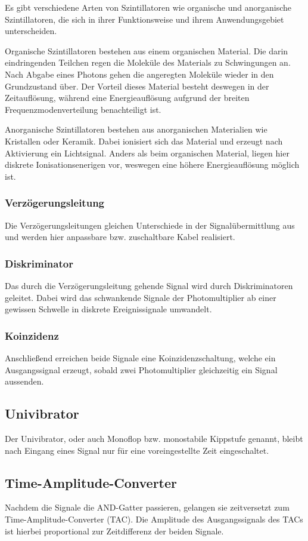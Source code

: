 Es gibt verschiedene Arten von Szintillatoren wie organische und anorganische Szintillatoren,
die sich in ihrer Funktionsweise und ihrem Anwendungsgebiet unterscheiden.

Organische Szintillatoren bestehen aus einem organischen Material.
Die darin eindringenden Teilchen regen die Moleküle des Materials zu Schwingungen an. 
Nach Abgabe eines Photons gehen die angeregten Moleküle wieder in den Grundzustand über.
Der Vorteil dieses Material besteht deswegen in der Zeitauflösung, 
während eine Energieauflösung aufgrund der breiten Frequenzmodenverteilung benachteiligt ist.

Anorganische Szintillatoren bestehen aus anorganischen Materialien wie Kristallen oder Keramik. 
Dabei ionisiert sich das Material und erzeugt nach Aktivierung ein Lichtsignal.
Anders als beim organischen Material, liegen hier diskrete Ionisationsenerigen vor,
weswegen eine höhere Energieauflösung möglich ist.

\subsubsection*{Verzögerungsleitung}
Die Verzögerungsleitungen gleichen Unterschiede in der Signalübermittlung aus
und werden hier anpassbare bzw. zuschaltbare Kabel realisiert.

\subsubsection*{Diskriminator}
Das durch die Verzögerungsleitung gehende Signal wird durch Diskriminatoren geleitet.
Dabei wird das schwankende Signale der Photomultiplier ab einer gewissen Schwelle in diskrete
Ereignissignale umwandelt.

\subsubsection*{Koinzidenz}
Anschließend erreichen beide Signale eine Koinzidenzschaltung, welche ein Ausgangssignal
erzeugt, sobald zwei Photomultiplier gleichzeitig ein Signal aussenden.

\subsection*{Univibrator}
Der Univibrator, oder auch Monoflop bzw. monostabile Kippstufe genannt,
bleibt nach Eingang eines Signal nur für eine voreingestellte Zeit eingeschaltet.

\subsection*{Time-Amplitude-Converter}
Nachdem die Signale die AND-Gatter passieren, 
gelangen sie zeitversetzt zum Time-Amplitude-Converter (TAC).
Die Amplitude des Ausgangssignals des TACs ist hierbei proportional zur Zeitdifferenz der beiden Signale.

